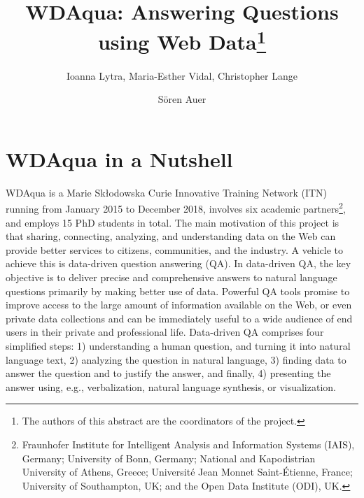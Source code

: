 \documentclass[a4paper]{llncs}
\begin{document}
	
	\mainmatter
	\title{WDAqua: Answering Questions using Web Data\thanks{The authors of this abstract are the coordinators of the project.}}
	
	\author{Ioanna Lytra, Maria-Esther Vidal, Christopher Lange \and S{\"o}ren Auer}
	
	\maketitle
	
	\section{WDAqua in a Nutshell} \label{sec:intro}
	WDAqua is a Marie Sk{\l}odowska Curie Innovative Training Network (ITN) running from January 2015 to December 2018, involves six academic partners\footnote{Fraunhofer Institute for Intelligent Analysis and Information Systems (IAIS), Germany; University of Bonn, Germany; National and Kapodistrian University of Athens, Greece; Universit{\'e} Jean Monnet Saint-{\'E}tienne, France; University of Southampton, UK; and the Open Data Institute (ODI), UK.}, and employs 15 PhD students in total.
        The main motivation of this project is that sharing, connecting, analyzing, and understanding data on the Web can provide better services to citizens, communities, and the industry.
        A vehicle to achieve this is data-driven question answering (QA).
        In data-driven QA, the key objective is to deliver precise and comprehensive answers to natural language questions primarily by making better use of data.
        Powerful QA tools promise to improve access to the large amount of information available on the Web, or even private data collections and can be immediately useful to a wide audience of end users in their private and professional life.
        Data-driven QA comprises four simplified steps: 1) understanding a human question, and turning it into natural language text, 2) analyzing the question in natural language, 3) finding data to answer the question and to justify the answer, and finally, 4) presenting the answer using, e.g., verbalization, natural language synthesis, or visualization.
	
\end{document}
